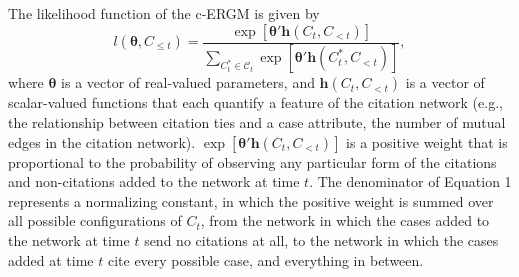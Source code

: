 \documentclass{cup-pan}
\begin{document}
The likelihood function of the c-ERGM is given by
\begin{equation}
l(\bm{\theta},C_{\leq t}) =  \frac{ \exp \left[ {\bm{\theta}'\bm{h}(C_{t},C_{<t}) } \right] }{ \sum_{C_t^* \in \mathcal{C}_t} \exp \left[ {\bm{\theta}'\bm{h}(C^*_{t},C_{<t}) }\right]  },
\end{equation}
where $\bm{\theta}$ is a vector of real-valued parameters, and $\bm{h}(C_{t},C_{<t})$ is a vector of scalar-valued functions that each quantify a feature of the citation network (e.g., the relationship between citation ties and a case attribute, the number of mutual edges in the citation network). $\exp \left[ {\bm{\theta}'\bm{h}(C_{t},C_{<t}) } \right]$ is a positive weight that is proportional to the probability of observing any particular form of the citations and non-citations added to the network at time $t$.  The denominator of Equation 1 represents a normalizing constant, in which the positive weight is summed over all possible configurations of $C_{t}$, from the network in which the cases added to the network at time $t$ send no citations at all, to the network in which the cases added at time $t$ cite every possible case, and everything in between. %
\end{document}
